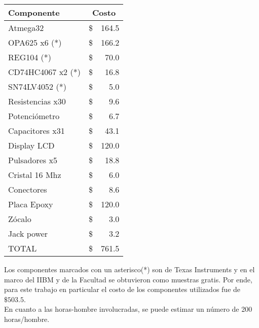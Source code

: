 \begin{table}[H]
\begin{center}
\begin{tabular}{|l|rr|}
    \hline
    \textbf{Componente} & \multicolumn{2}{c|}{\textbf{Costo}} \\ \hline
    Atmega32            & \hspace{2.8cm}\$ &   164.5 \\ \hline
    OPA625 x6 (*)       & \$               &   166.2 \\ \hline
    REG104 (*)          & \$               &   70.0 \\ \hline
    CD74HC4067 x2 (*)   & \$               &   16.8 \\ \hline
    SN74LV4052 (*)      & \$               &   5.0 \\ \hline
    Resistencias x30    & \$               &   9.6 \\ \hline
    Potenciómetro       & \$               &   6.7 \\ \hline
    Capacitores x31     & \$               &   43.1 \\ \hline
    Display LCD         & \$               &   120.0 \\ \hline
    Pulsadores x5       & \$               &   18.8 \\ \hline
    Cristal 16 Mhz      & \$               &   6.0 \\ \hline 
    Conectores          & \$               &   8.6 \\ \hline       
    Placa Epoxy         & \$               &   120.0 \\ \hline
    Zócalo              & \$               &   3.0 \\ \hline
    Jack power          & \$               &   3.2 \\ \hline           
    TOTAL               & \$               &   761.5 \\ \hline
\end{tabular}
\end{center}
\end{table}

Los componentes marcados con un asterisco(*) son de Texas Instruments y en el marco del IIBM y de la Facultad se obtuvieron como muestras gratis. Por ende, para este trabajo en particular el costo de los componentes utilizados fue de $\$ 503.5$.\\

En cuanto a las horas-hombre involucradas, se puede estimar un número de 200 horas/hombre. 



